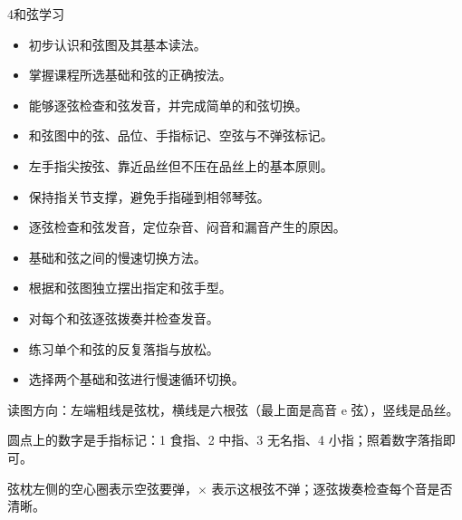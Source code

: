 \begin{lessoncard}{4}{和弦学习}
\begin{itemize}
\item 初步认识和弦图及其基本读法。
\item 掌握课程所选基础和弦的正确按法。
\item 能够逐弦检查和弦发音，并完成简单的和弦切换。
\end{itemize}
\begin{itemize}
\item 和弦图中的弦、品位、手指标记、空弦与不弹弦标记。
\item 左手指尖按弦、靠近品丝但不压在品丝上的基本原则。
\item 保持指关节支撑，避免手指碰到相邻琴弦。
\item 逐弦检查和弦发音，定位杂音、闷音和漏音产生的原因。
\item 基础和弦之间的慢速切换方法。
\end{itemize}
\begin{itemize}
\item 根据和弦图独立摆出指定和弦手型。
\item 对每个和弦逐弦拨奏并检查发音。
\item 练习单个和弦的反复落指与放松。
\item 选择两个基础和弦进行慢速循环切换。
\end{itemize}
\begin{fignote}
\begin{center}
\chordscheme[name = C, finger = {3/5:3, 2/4:2, 1/2:1}, ring = {1,3}, mute = {6}]
\hspace{14mm}
\chordscheme[name = Am, finger = {2/4:2, 2/3:3, 1/2:1}, ring = {1,5}, mute = {6}]
\end{center}
\begin{fignotes}
\item 读图方向：左端粗线是弦枕，横线是六根弦（最上面是高音 e 弦），竖线是品丝。
\item 圆点上的数字是手指标记：1 食指、2 中指、3 无名指、4 小指；照着数字落指即可。
\item 弦枕左侧的空心圈表示空弦要弹，$\times$ 表示这根弦不弹；逐弦拨奏检查每个音是否清晰。
\end{fignotes}
\end{fignote}
\end{lessoncard}

